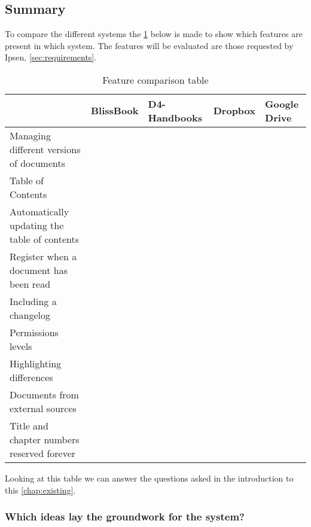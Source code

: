 \subsection{Summary}
To compare the different systems the \cref{tab:Exsisting} below is made to show which features are present in which system.
The features will be evaluated are those requested by Ipsen, \cref{sec:requirements}.

\begin{table}[H]
	\begin{center}
		\begin{tabular}{| m{5cm}|m{1.6cm}|m{2cm}|m{1.5cm}|m{1.2cm}|}
			\hline
			& BlissBook  & D4-Handbooks & Dropbox & Google \newline Drive \\
			\hline
			Managing different versions of documents & \checkmark &  &  & \checkmark \\
			\hline
			Table of Contents & \checkmark & \checkmark  & & \\
			\hline
			Automatically updating the table of contents & \checkmark & \checkmark  &  & \\
			\hline
			Register when a document has been read & \checkmark & \checkmark &  & \\
			\hline
			Including a changelog & \checkmark & \checkmark  &  & \\
			\hline
			Permissions levels & \checkmark &  & \checkmark & \checkmark \\
			\hline
			Highlighting differences & \checkmark &  &  & \checkmark\\
			\hline
			Documents from external \newline sources &  &  & \checkmark & \checkmark \\
			\hline
			Title and chapter numbers \newline reserved forever &  &  &  & \\
			\hline
		\end{tabular}
		\caption{Feature comparison table}\label{tab:Exsisting}
	\end{center}
\end{table}

Looking at this table we can answer the questions asked in the introduction to this \cref{chap:existing}.

\subsubsection*{Which ideas lay the groundwork for the system?}

